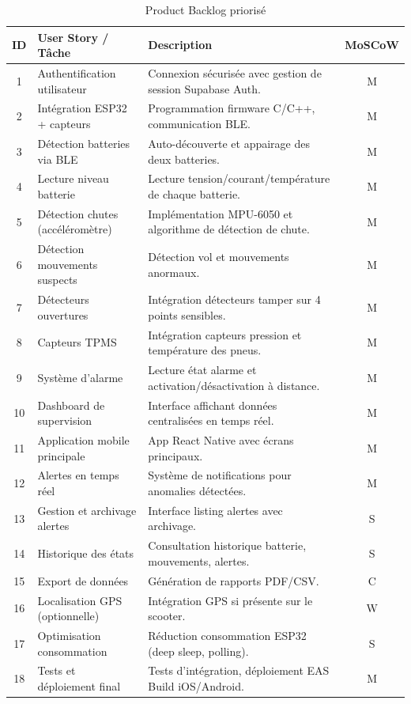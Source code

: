 \documentclass[12pt, a4paper]{report}
\begin{document}
\begin{table}[H]
  \centering
  \caption{Product Backlog priorisé}
  \label{tab:backlog}
  \renewcommand{\arraystretch}{1.3}
  \small
  \begin{tabularx}{\textwidth}{|c|p{4cm}|X|c|}
    \hline
    \rowcolor{isimablue!20}
    \textbf{ID} & \textbf{User Story / Tâche} & \textbf{Description} & \textbf{MoSCoW} \\
    \hline
    1  & Authentification utilisateur      & Connexion sécurisée avec gestion de session Supabase Auth. & M \\
    \hline
    2  & Intégration ESP32 + capteurs      & Programmation firmware C/C++, communication BLE. & M \\
    \hline
    3  & Détection batteries via BLE       & Auto-découverte et appairage des deux batteries. & M \\
    \hline
    4  & Lecture niveau batterie           & Lecture tension/courant/température de chaque batterie. & M \\
    \hline
    5  & Détection chutes (accéléromètre)  & Implémentation MPU-6050 et algorithme de détection de chute. & M \\
    \hline
    6  & Détection mouvements suspects     & Détection vol et mouvements anormaux. & M \\
    \hline
    7  & Détecteurs ouvertures             & Intégration détecteurs tamper sur 4 points sensibles. & M \\
    \hline
    8  & Capteurs TPMS                     & Intégration capteurs pression et température des pneus. & M \\
    \hline
    9  & Système d'alarme                  & Lecture état alarme et activation/désactivation à distance. & M \\
    \hline
    10 & Dashboard de supervision          & Interface affichant données centralisées en temps réel. & M \\
    \hline
    11 & Application mobile principale     & App React Native avec écrans principaux. & M \\
    \hline
    12 & Alertes en temps réel             & Système de notifications pour anomalies détectées. & M \\
    \hline
    13 & Gestion et archivage alertes      & Interface listing alertes avec archivage. & S \\
    \hline
    14 & Historique des états              & Consultation historique batterie, mouvements, alertes. & S \\
    \hline
    15 & Export de données                 & Génération de rapports PDF/CSV. & C \\
    \hline
    16 & Localisation GPS (optionnelle)    & Intégration GPS si présente sur le scooter. & W \\
    \hline
    17 & Optimisation consommation         & Réduction consommation ESP32 (deep sleep, polling). & S \\
    \hline
    18 & Tests et déploiement final        & Tests d'intégration, déploiement EAS Build iOS/Android. & M \\
    \hline
  \end{tabularx}
\end{table}
\end{document}

